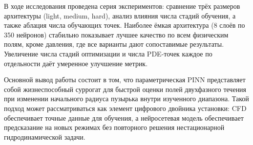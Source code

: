 \documentclass[12pt,a4paper]{article}
\begin{document}
В ходе исследования проведена серия экспериментов:
сравнение трёх размеров архитектуры (light, medium, hard), анализ влияния числа
стадий обучения, а также аблация числа обучающих точек. Наиболее ёмкая
архитектура (8 слоёв по 350 нейронов) стабильно показывает лучшее качество по
всем физическим полям, кроме давления, где все варианты дают сопоставимые
результаты. Увеличение числа стадий оптимизации и числа PDE-точек каждое по
отдельности даёт умеренное улучшение метрик.

Основной вывод работы состоит в том, что параметрическая PINN представляет
собой жизнеспособный суррогат для быстрой оценки полей двухфазного течения при
изменении начального радиуса пузырька внутри изученного диапазона. Такой подход
может рассматриваться как элемент цифрового двойника установки: CFD обеспечивает
точные данные для обучения, а нейросетевая модель обеспечивает предсказание
на новых режимах без повторного решения нестационарной гидродинамической задачи.
\end{document}
